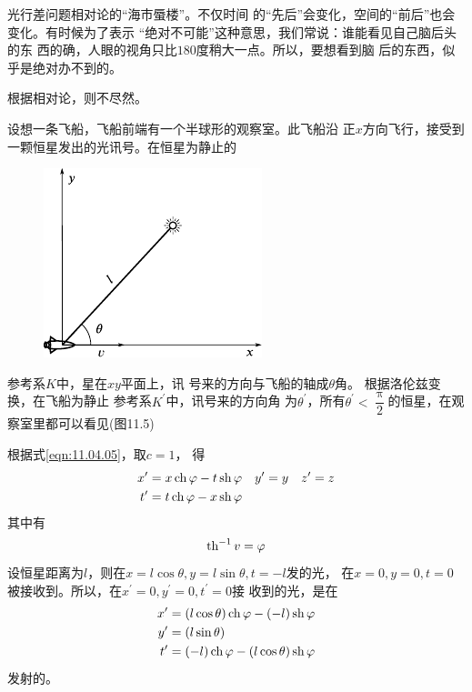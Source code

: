 \example 光行差问题相对论的“海市蜃楼”。不仅时间
的“先后”会变化，空间的“前后”也会变化。有时候为了表示
“绝对不可能”这种意思，我们常说：谁能看见自己脑后头的东
西的确，人眼的视角只比$ 180 $度稍大一点。所以，要想看到脑
后的东西，似乎是绝对办不到的。

根据相对论，则不尽然。

设想一条飞船，飞船前端有一个半球形的观察室。此飞船沿
正$ x $方向飞行，接受到一颗恒星发出的光讯号。在恒星为静止的

\clearpage\noindent
\begin{figure}
    \centering
    \includegraphics{figure/fig11.05}
    \caption{}
    \label{fig:11.05}
\end{figure}
参考系$ K $中，星在$ xy $平面上，讯
号来的方向与飞船的轴成$ \theta $角。
根据洛伦兹变换，在飞船为静止
参考系$ K ^ { \prime }$中，讯号来的方向角
为$ \theta ^ { \prime } $，所有$  \theta ^ { \prime } < \dfrac { \uppi } { 2 } $的恒星，在观
察室里都可以看见(图11.5)

根据式\eqref{eqn:11.04.05}，取$  c = 1   $，
得
\begin{align*}
    x ^ { \prime } &= x \operatorname{ch} \varphi - t \operatorname{sh} \varphi
    \quad y ^ { \prime } = y \quad z ^ { \prime } = z \\
    t ^ { \prime } &= t \operatorname{ch} \varphi - x \operatorname{sh} \varphi
\end{align*}
其中有
\begin{equation*}
    \operatorname{th} ^ { - 1 } v = \varphi
\end{equation*}
设恒星距离为$ l $，则在$ x = l \cos \theta , y = l \sin \theta , t = - l $发的光，
在$ x = 0 , y = 0 , t = 0 $被接收到。所以，在$ x ^ { \prime } = 0 , y ^ { \prime } = 0 , t ^ { \prime } = 0 $接
收到的光，是在
\begin{align*}
    x ^ { \prime } &= \left( l \cos \theta \right)  \operatorname{ch} \varphi - \left( - l \right) \operatorname{sh} \varphi \\
    y ^ { \prime } &= \left( l \sin \theta \right) \\
    t ^ { \prime } &= \left( - l \right) \operatorname{ch} \varphi - \left( l \cos \theta \right) \operatorname{sh} \varphi
\end{align*}
发射的。

